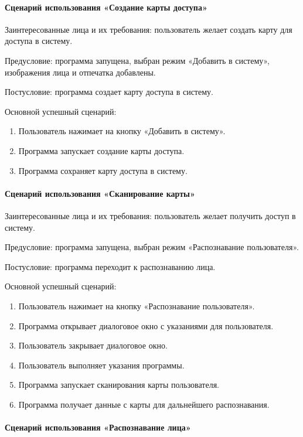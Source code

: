 \paragraph{Сценарий использования «Создание карты доступа»}

Заинтересованные лица и их требования: пользователь желает создать карту для доступа в систему.

Предусловие: программа запущена, выбран режим «Добавить в систему», изображения лица и отпечатка добавлены.

Постусловие: программа создает карту доступа в систему.

Основной успешный сценарий:
\begin{enumerate}
	\item Пользователь нажимает на кнопку «Добавить в систему».
	\item Программа запускает создание карты доступа.
	\item Программа сохраняет карту доступа в систему.
\end{enumerate}

\paragraph{Сценарий использования «Сканирование карты»}

Заинтересованные лица и их требования: пользователь желает получить доступ в систему.

Предусловие: программа запущена, выбран режим «Распознавание пользователя».

Постусловие: программа переходит к распознаванию лица.

Основной успешный сценарий:
\begin{enumerate}
	\item Пользователь нажимает на кнопку «Распознавание пользователя».
	\item Программа открывает диалоговое окно с указаниями для пользователя.
	\item Пользователь закрывает диалоговое окно.
	\item Пользователь выполняет указания программы.
	\item Программа запускает сканирования карты пользователя.
	\item Программа получает данные с карты для дальнейшего распознавания.
\end{enumerate}

\paragraph{Сценарий использования «Распознавание лица»}

